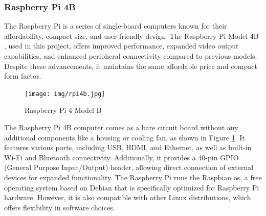 


\subsubsection{Raspberry Pi 4B}
\label{subsec:rpi}

The Raspberry Pi is a series of single-board computers known for their affordability, compact size, and user-friendly design. The Raspberry Pi Model 4B \cite{raspberry-front}, used in this project, offers improved performance, expanded video output capabilities, and enhanced peripheral connectivity compared to previous models. Despite these advancements, it maintains the same affordable price and compact form factor.


\begin{figure}[H]
  \centering
  \texttt{[image: img/rpi4b.jpg]}
  \caption{Raspberry Pi 4 Model B}
  \label{fig:rpi4b}
\end{figure}

The Raspberry Pi 4B computer comes as a bare circuit board without any additional components like a housing or cooling fan, as shown in Figure \ref{fig:rpi4b}. It features various ports, including USB, HDMI, and Ethernet, as well as built-in Wi-Fi and Bluetooth connectivity. Additionally, it provides a 40-pin GPIO (General Purpose Input/Output) header, allowing direct connection of external devices for expanded functionality.
The Raspberry Pi runs the Raspbian \acrshort{os}, a free operating system based on Debian that is specifically optimized for Raspberry Pi hardware. However, it is also compatible with other Linux distributions, which offers flexibility in software choices.

